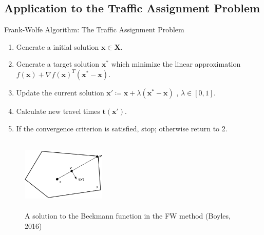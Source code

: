 \documentclass{beamer}
\newcommand{\vect}[1]{\boldsymbol{#1}}
\begin{document}
\subsection{Application to the Traffic Assignment Problem}
\begin{frame}{Frank-Wolfe Algorithm: The Traffic Assignment Problem}
\begin{enumerate}
	\item Generate a initial solution $\vect{x} \in \vect{X}$.
	\item Generate a target solution $ \vect{x}^{*}$ which minimize the linear approximation  $ f(\vect{x}) + \nabla f(\vect{x})^T(\vect{x}^*-\vect{x})  $.
	\item Update the current solution $\vect{x'} \coloneqq  \vect{x} + \lambda(\vect{x}^{*}-\vect{x})$ , $\lambda \in [0,1]$.
	\item Calculate new travel times $\vect{t}(\vect{x'})$.
	\item If the convergence criterion is satisfied, stop; otherwise return to 2.
\end{enumerate}
	\begin{figure}
	\includegraphics[width=4cm, height=3.5cm]{Fig/FrankWolfeSol.png}
	\caption{A solution to the Beckmann function in the FW method (Boyles, 2016)}
	\end{figure}
\end{frame}
\end{document}
